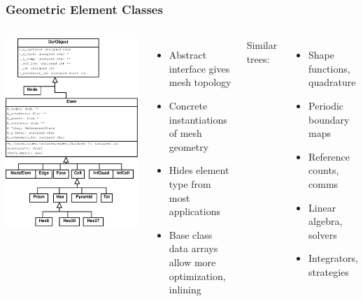 \documentclass[mathserif]{beamer}
\begin{document}
\begin{frame}
\frametitle{Geometric Element Classes}

\begin{columns}
\begin{center}
\vspace{-5mm}
\includegraphics[width=.75\textwidth]{DofObjects}
\end{center}
\begin{itemize}
\item Abstract interface gives mesh topology
\item Concrete instantiations of mesh geometry
\item Hides element type from most applications
\item Base class data arrays allow more optimization, inlining
\end{itemize}

Similar trees:

\begin{itemize}
\item Shape functions, quadrature
\item Periodic boundary maps
\item Reference counts, comms
\item Linear algebra, solvers
\item Integrators, strategies
\end{itemize}
\end{columns}

\end{frame}
\end{document}

